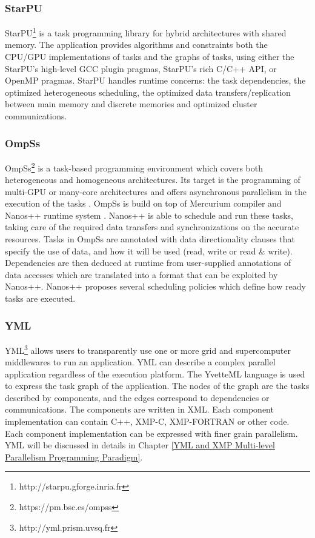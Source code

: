 \subsubsection{StarPU}

StarPU\footnote{http://starpu.gforge.inria.fr} \cite{augonnet2011starpu} is a task programming library for hybrid architectures with shared memory. The application provides algorithms and constraints both the CPU/GPU implementations of tasks and the graphs of tasks, using either the StarPU's high-level GCC plugin pragmas, StarPU's rich C/C++ API, or OpenMP pragmas. StarPU handles runtime concerns: the task dependencies, the optimized heterogeneous scheduling, the optimized data transfers/replication between main memory and discrete memories and optimized cluster communications.

\subsubsection{OmpSs}

OmpSs\footnote{https://pm.bsc.es/ompss} is a task-based programming environment which covers both heterogeneous and homogeneous architectures. Its target is the programming of multi-GPU or many-core architectures and offers asynchronous parallelism in the execution of the tasks \cite{duran2011ompss}. OmpSs is build on top of Mercurium compiler\cite{balart2004nanos} and Nanos++ runtime system \cite{planas2013selection}. Nanos++ is able to schedule and run these tasks, taking care of the required data transfers and synchronizations on the accurate resources. Tasks in OmpSs are annotated with data directionality clauses that specify the use of data, and how it will be used (read, write or read \& write). Dependencies are then deduced at runtime from user-supplied annotations of data accesses which are translated into a format that can be exploited by Nanos++. Nanos++ proposes several scheduling policies which define how ready tasks are executed. 


\subsubsection{YML}

YML\footnote{http://yml.prism.uvsq.fr} \cite{delannoyyml} allows users to transparently use one or more grid and supercomputer middlewares to run an application. YML can describe a complex parallel application regardless of the execution platform. The YvetteML language is used to express the task graph of the application. The nodes of the graph are the tasks described by components, and the edges correspond to dependencies or communications. The components are written in XML. Each component implementation can contain C++, XMP-C, XMP-FORTRAN or other code. Each component implementation can be expressed with finer grain parallelism. YML will be discussed in details in Chapter \ref{YML and XMP Multi-level Parallelism Programming Paradigm}.

